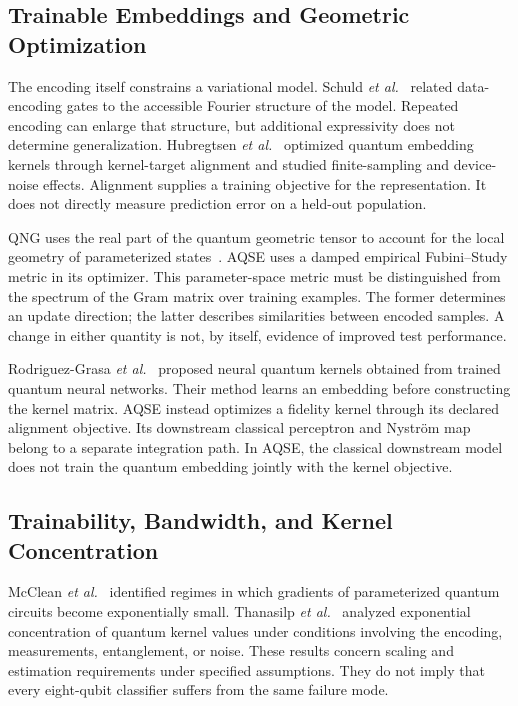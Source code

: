\subsection{Trainable Embeddings and Geometric Optimization}

The encoding itself constrains a variational model. Schuld \emph{et al.}~\cite{schuld2021encoding} related data-encoding gates to the accessible Fourier structure of the model. Repeated encoding can enlarge that structure, but additional expressivity does not determine generalization. Hubregtsen \emph{et al.}~\cite{hubregtsen2022training} optimized quantum embedding kernels through kernel-target alignment and studied finite-sampling and device-noise effects. Alignment supplies a training objective for the representation. It does not directly measure prediction error on a held-out population.

QNG uses the real part of the quantum geometric tensor to account for the local geometry of parameterized states~\cite{stokes2020qng}. AQSE uses a damped empirical Fubini--Study metric in its optimizer. This parameter-space metric must be distinguished from the spectrum of the Gram matrix over training examples. The former determines an update direction; the latter describes similarities between encoded samples. A change in either quantity is not, by itself, evidence of improved test performance.

Rodriguez-Grasa \emph{et al.}~\cite{rodriguez2025neural} proposed neural quantum kernels obtained from trained quantum neural networks. Their method learns an embedding before constructing the kernel matrix. AQSE instead optimizes a fidelity kernel through its declared alignment objective. Its downstream classical perceptron and Nystr\"om map belong to a separate integration path. In AQSE, the classical downstream model does not train the quantum embedding jointly with the kernel objective.

\subsection{Trainability, Bandwidth, and Kernel Concentration}

McClean \emph{et al.}~\cite{mcclean2018barren} identified regimes in which gradients of parameterized quantum circuits become exponentially small. Thanasilp \emph{et al.}~\cite{thanasilp2024concentration} analyzed exponential concentration of quantum kernel values under conditions involving the encoding, measurements, entanglement, or noise. These results concern scaling and estimation requirements under specified assumptions. They do not imply that every eight-qubit classifier suffers from the same failure mode.


